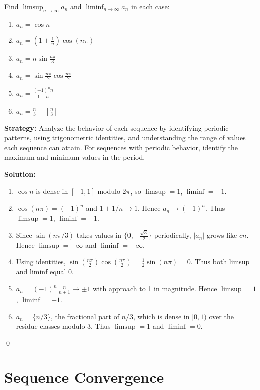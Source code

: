 \begin{problembox}
Find \(\limsup_{n \to \infty} a_n\) and \(\liminf_{n \to \infty} a_n\) in each case:
\begin{enumerate}[label=\alph*)]
\item \(a_n=\cos n\)
\item \(a_n=\left(1 + \frac{1}{n}\right) \cos (n\pi)\)
\item \(a_n=n \sin \frac{n\pi}{3}\)
\item \(a_n=\sin \frac{n\pi}{2} \cos \frac{n\pi}{2}\)
\item \(a_n=\frac{(-1)^n n}{1 + n}\)
\item \(a_n=\frac{n}{3} - \left[\frac{n}{3}\right]\)
\end{enumerate}
\end{problembox}

\noindent\textbf{Strategy:} Analyze the behavior of each sequence by identifying periodic patterns, using trigonometric identities, and understanding the range of values each sequence can attain. For sequences with periodic behavior, identify the maximum and minimum values in the period.

\bigskip\noindent\textbf{Solution:}
\begin{enumerate}[label=(\alph*)]
\item \(\cos n\) is dense in \([-1,1]\) modulo \(2\pi\), so \(\limsup=1\), \(\liminf=-1\).
\item \(\cos(n\pi)=(-1)^n\) and \(1+1/n\to 1\). Hence \(a_n\to (-1)^n\). Thus \(\limsup=1\), \(\liminf=-1\).
\item Since \(\sin(n\pi/3)\) takes values in \(\{0,\pm\tfrac{\sqrt{3}}{2}\}\) periodically, \(|a_n|\) grows like \(cn\). Hence \(\limsup=+\infty\) and \(\liminf=-\infty\).
\item Using identities, \(\sin(\tfrac{n\pi}{2})\cos(\tfrac{n\pi}{2})=\tfrac{1}{2}\sin(n\pi)=0\). Thus both limsup and liminf equal 0.
\item \(a_n=(-1)^n\, \tfrac{n}{n+1}\to \pm 1\) with approach to 1 in magnitude. Hence \(\limsup=1\), \(\liminf=-1\).
\item \(a_n=\{n/3\}\), the fractional part of \(n/3\), which is dense in \([0,1)\) over the residue classes modulo 3. Thus \(\limsup=1\) and \(\liminf=0\).
\end{enumerate}\qed
\section{Sequence Convergence}

